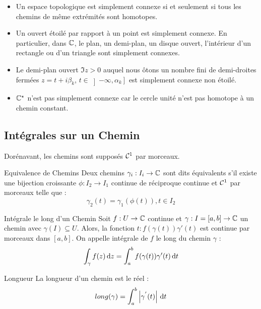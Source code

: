 \documentclass{cours}
\begin{document}
\begin{propositionfr}{}{}
    \begin{itemize}
        \item Un espace topologique est simplement connexe si et seulement si tous les chemins de même extrémités sont homotopes.
        \item Un ouvert étoilé par rapport à un point est simplement connexe. En particulier, dans $\mathbb{C}$, le plan, un demi-plan, un disque ouvert, l'intérieur d'un rectangle ou d'un triangle sont simplement connexes. 
        \item Le demi-plan ouvert $\Im z > 0$ auquel nous ôtons un nombre fini de demi-droites fermées $z = t +i\beta_{k}$, $t\in \left]-\infty, \alpha_{k}\right]$ est simplement connexe non étoilé. 
        \item $\mathbb{C}^{\star}$ n'est pas simplement connexe car le cercle unité n'est pas homotope à un chemin constant. 
    \end{itemize}
\end{propositionfr}

\subsection{Intégrales sur un Chemin}
Dorénavant, les chemins sont supposés $\mathcal{C}^{1}$ par morceaux. 

\begin{définition}{Equivalence de Chemins}{}
    Deux chemins $\gamma_{i} : I_{i} \to \mathbb{C}$ sont dits équivalents s'il existe une bijection croissante $\phi : I_{2} \to I_{1}$ continue de réciproque continue et $\mathcal{C}^{1}$ par morceaux telle que : 
    \[
        \gamma_{2}(t) = \gamma_{1}(\phi(t)), t\in I_{2}
    \]
\end{définition}

\begin{définition}{Intégrale le long d'un Chemin}{}
    Soit $f : U \to \mathbb{C}$ continue et $\gamma : I = [a, b] \to \mathbb{C}$ un chemin avec $\gamma(I) \subseteq U$. Alors, la fonction $t : f(\gamma(t))\gamma'(t)$ est continue par morceaux dans $[a, b]$. On appelle intégrale de $f$ le long du chemin $\gamma$ : 
    \[
        \int_{\gamma}f(z){\rm \, d} z = \int_{a}^{b}f(\gamma(t))\gamma'(t){\rm \, d} t
    \]
\end{définition}

\begin{définition}{Longueur}{}
    La longueur d'un chemin est le réel : 
    \[
        long(\gamma) = \int_{a}^{b}\left|\gamma^{'}(t)\right|{\rm \, d} t
    \]
\end{définition}
\end{document}
